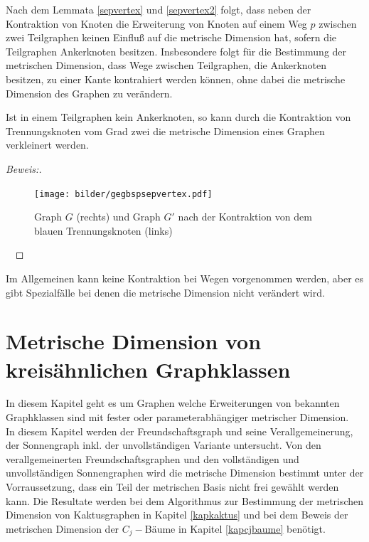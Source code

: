 \begin{bem}
Nach dem Lemmata \ref{sepvertex} und \ref{sepvertex2} folgt, dass neben der Kontraktion von Knoten die Erweiterung von Knoten auf einem Weg $p$ zwischen zwei Teilgraphen keinen Einfluß auf die metrische Dimension hat, sofern die Teilgraphen Ankerknoten besitzen. Insbesondere folgt für die Bestimmung der metrischen Dimension, dass Wege zwischen Teilgraphen, die Ankerknoten besitzen, zu einer Kante kontrahiert werden können, ohne dabei die metrische Dimension des Graphen zu verändern.
\end{bem}
\begin{lem}
Ist in einem Teilgraphen kein Ankerknoten, so kann durch die Kontraktion von Trennungsknoten vom Grad zwei die metrische Dimension eines Graphen verkleinert werden.
\end{lem}
\begin{proof}[Beweis:] ~ \newline
\vspace{-5mm}
\begin{figure}[!h]
\centering
\texttt{[image: bilder/gegbspsepvertex.pdf]}
\caption{Graph $G$ (rechts) und Graph $G'$ nach der Kontraktion von dem blauen Trennungsknoten (links)}
\end{figure} 
~\linebreak
\end{proof}
Im Allgemeinen kann keine Kontraktion bei Wegen vorgenommen werden, aber es gibt Spezialfälle bei denen die metrische Dimension nicht verändert wird.
\clearpage
\chapter{Metrische Dimension von kreisähnlichen Graphklassen}
In diesem Kapitel geht es um Graphen welche Erweiterungen von bekannten Graphklassen sind mit fester oder parameterabhängiger metrischer Dimension.\\In diesem Kapitel werden der Freundschaftsgraph und seine Verallgemeinerung, der Sonnengraph inkl. der unvollständigen Variante untersucht.
Von den verallgemeinerten Freundschaftsgraphen und den vollständigen und unvollständigen Sonnengraphen wird die metrische Dimension bestimmt unter der Vorraussetzung, dass ein Teil der metrischen Basis nicht frei gewählt werden kann. Die Resultate werden bei dem Algorithmus zur Bestimmung der metrischen Dimension von Kaktusgraphen in Kapitel \ref{kapkaktus} und bei dem Beweis der metrischen Dimension der $C_j-$Bäume in Kapitel \ref{kapcjbaume} benötigt.
\vspace{-4mm}
